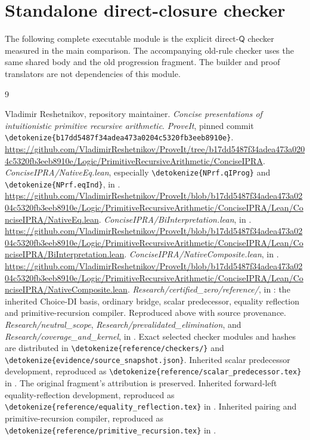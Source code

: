 \documentclass[11pt,letterpaper]{article}
\theoremstyle{definition}\newtheorem{definition}[theorem]{Definition}
\theoremstyle{remark}\newtheorem{remark}[theorem]{Remark}
\newcommand{\Q}{\mathsf Q}
\newcommand{\file}[1]{\expandafter\nolinkurl\expandafter{\detokenize{#1}}}
\begin{document}






\clearpage
\section{Standalone direct-closure checker}
\label{sec:source}
The following complete executable module is the explicit direct-$\Q$
checker measured in the main comparison. The accompanying old-rule
checker uses the same shared body and the old progression fragment.
The builder and proof translators are not dependencies of this module.


\clearpage
\begin{thebibliography}{9}
\raggedright
{}
Vladimir Reshetnikov, repository maintainer.
\emph{Concise presentations of intuitionistic primitive recursive arithmetic}.
\emph{ProveIt}, pinned commit
\file{b17dd5487f34adea473a0204c5320fb3eeb8910e}.
\url{https://github.com/VladimirReshetnikov/ProveIt/tree/b17dd5487f34adea473a0204c5320fb3eeb8910e/Logic/PrimitiveRecursiveArithmetic/ConciseIPRA}.
\emph{ConciseIPRA/NativeEq.lean}, especially
\file{NPrf.qIProg} and \file{NPrf.eqInd}, in \cite{repo}.
\url{https://github.com/VladimirReshetnikov/ProveIt/blob/b17dd5487f34adea473a0204c5320fb3eeb8910e/Logic/PrimitiveRecursiveArithmetic/ConciseIPRA/Lean/ConciseIPRA/NativeEq.lean}.
\emph{ConciseIPRA/BiInterpretation.lean}, in \cite{repo}.
\url{https://github.com/VladimirReshetnikov/ProveIt/blob/b17dd5487f34adea473a0204c5320fb3eeb8910e/Logic/PrimitiveRecursiveArithmetic/ConciseIPRA/Lean/ConciseIPRA/BiInterpretation.lean}.
\emph{ConciseIPRA/NativeComposite.lean}, in \cite{repo}.
\url{https://github.com/VladimirReshetnikov/ProveIt/blob/b17dd5487f34adea473a0204c5320fb3eeb8910e/Logic/PrimitiveRecursiveArithmetic/ConciseIPRA/Lean/ConciseIPRA/NativeComposite.lean}.
\emph{Research/certified\_zero/reference/}, in \cite{repo}:
the inherited Choice-DI basis, ordinary bridge, scalar predecessor,
equality reflection and primitive-recursion compiler. Reproduced above
with source provenance.
\emph{Research/neutral\_scope},
\emph{Research/prevalidated\_elimination}, and
\emph{Research/coverage\_and\_kernel}, in \cite{repo}.
Exact selected checker modules and hashes are distributed in
\file{reference/checkers/} and \file{evidence/source_snapshot.json}.
Inherited scalar predecessor development, reproduced as
\file{reference/scalar_predecessor.tex} in \cite{inherited}.
The original fragment's attribution is preserved.
Inherited forward-left equality-reflection development, reproduced as
\file{reference/equality_reflection.tex} in \cite{inherited}.
Inherited pairing and primitive-recursion compiler, reproduced as
\file{reference/primitive_recursion.tex} in \cite{inherited}.
\end{thebibliography}
\end{document}
